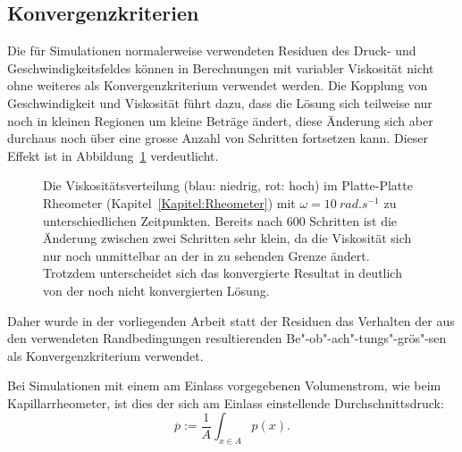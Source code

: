 \subsection{Konvergenzkriterien}
Die für Simulationen normalerweise verwendeten Residuen des Druck- und Geschwindigkeitsfeldes können in Berechnungen mit variabler Viskosität nicht ohne weiteres als Konvergenzkriterium verwendet werden.
Die Kopp\-lung von Geschwindigkeit und Viskosität führt dazu, dass die Lösung sich teilweise nur noch in kleinen Regionen um kleine Beträge ändert, diese Änderung sich aber durchaus noch über eine grosse Anzahl von Schritten fortsetzen kann. Dieser Effekt ist in Abbildung~\ref{fig:platRheoNu} verdeutlicht.
\begin{figure}
    \centering
    \caption{Die Viskositätsverteilung (blau: niedrig, rot: hoch) im Platte-Platte Rheometer (Kapitel~\ref{Kapitel:Rheometer}) mit $\omega=\SI{10}{rad.s^{-1}}$ zu unterschiedlichen Zeitpunkten. Bereits nach 600 Schritten ist die Änderung zwischen zwei Schritten sehr klein, da die Viskosität sich nur noch unmittelbar an der in  zu sehenden Grenze ändert. Trotzdem unterscheidet sich das konvergierte Resultat in  deutlich von der noch nicht konvergierten Lösung.}
    \label{fig:platRheoNu}
\end{figure}
Daher wurde in der vorliegenden Arbeit statt der Residuen das Verhalten der aus den verwendeten Randbedingungen resultierenden Be"-ob"-ach"-tungs"-grös"-sen als Konvergenzkriterium verwendet.

Bei Simulationen mit einem am Einlass vorgegebenen Volumenstrom, wie beim Kapillarrheometer, ist dies der sich am Einlass einstellende Durchschnittsdruck:
%
\begin{equation}
    \overline p:= \frac{1}{A}\int_{x\in A}p\left( x \right).
\end{equation}
%

